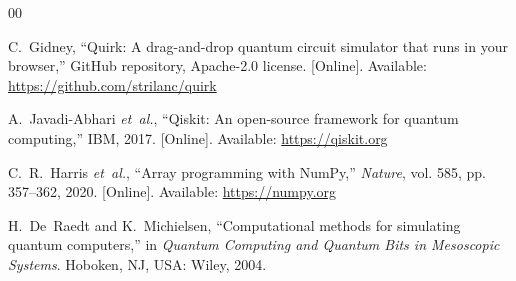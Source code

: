 \documentclass[conference]{IEEEtran}
\begin{document}
\begin{thebibliography}{00}

C.~Gidney, ``Quirk: A drag-and-drop quantum circuit simulator that runs in your browser,'' GitHub repository, Apache-2.0 license. [Online]. Available: \url{https://github.com/strilanc/quirk}

A.~Javadi-Abhari \emph{et~al.}, ``Qiskit: An open-source framework for quantum computing,'' IBM, 2017. [Online]. Available: \url{https://qiskit.org}

C.~R.~Harris \emph{et~al.}, ``Array programming with NumPy,'' \emph{Nature}, vol. 585, pp. 357--362, 2020. [Online]. Available: \url{https://numpy.org}

H.~De~Raedt and K.~Michielsen, ``Computational methods for simulating quantum computers,'' in \emph{Quantum Computing and Quantum Bits in Mesoscopic Systems}. Hoboken, NJ, USA: Wiley, 2004.

\end{thebibliography}
\end{document}
